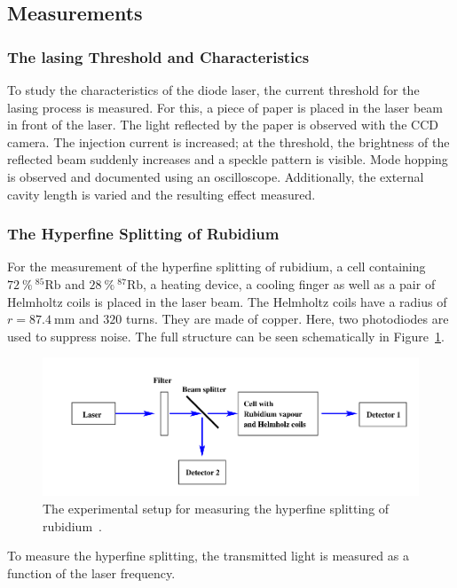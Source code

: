 \subsection{Measurements}
\label{sec:measurements}
\subsubsection{The lasing Threshold and Characteristics}
\label{sec:threshold}
To study the characteristics of the diode laser, the current threshold for the lasing process is measured.
For this, a piece of paper is placed in the laser beam in front of the laser. The light reflected by the paper
is observed with the CCD camera. The injection current is increased; at the threshold, the brightness of the
reflected beam suddenly increases and a speckle pattern is visible. Mode hopping is observed and documented
using an oscilloscope. Additionally, the external cavity length is varied and the resulting effect measured.
\subsubsection{The Hyperfine Splitting of Rubidium}
\label{sec:rubidium}
For the measurement of the hyperfine splitting of rubidium, a cell containing $\SI{72}{\percent} \ ^{85}\text{Rb}$
and $\SI{28}{\percent} \ ^{87}\text{Rb}$, a heating device, a cooling finger as well as a pair of Helmholtz coils
is placed in the laser beam. The Helmholtz coils have a radius of $r=\SI{87.4}{\milli\meter}$ and $320$ turns.
They are made of copper. Here, two photodiodes are used to suppress noise. The full structure can be seen
schematically in Figure~\ref{fig:structure}.
\begin{figure}[H]
  \centering
  \includegraphics[scale=0.38]{./pictures/structure.png}
  \caption{The experimental setup for measuring the hyperfine splitting of rubidium~\cite{V61}.}
  \label{fig:structure}
\end{figure}
\noindent
To measure the hyperfine splitting, the transmitted light is measured as a function of the laser frequency.
